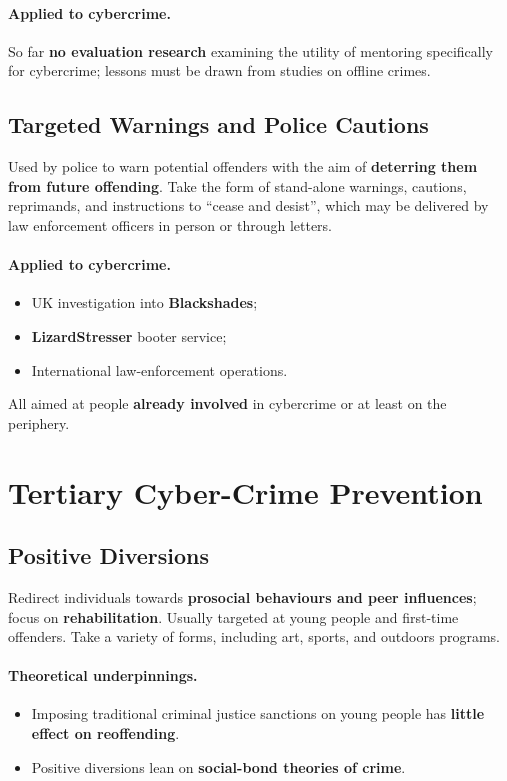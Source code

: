 \documentclass[11pt,a4paper,openany]{report}
\theoremstyle{definition}
\theoremstyle{plain}
\theoremstyle{remark}
\begin{document}
\paragraph{Applied to cybercrime.} So far \textbf{no evaluation research} examining the utility of mentoring specifically for cybercrime; lessons must be drawn from studies on offline crimes.

\subsection{Targeted Warnings and Police Cautions}

Used by police to warn potential offenders with the aim of \textbf{deterring them from future offending}. Take the form of stand-alone warnings, cautions, reprimands, and instructions to ``cease and desist'', which may be delivered by law enforcement officers in person or through letters.

\paragraph{Applied to cybercrime.}
\begin{itemize}
    \item UK investigation into \textbf{Blackshades};
    \item \textbf{LizardStresser} booter service;
    \item International law-enforcement operations.
\end{itemize}
All aimed at people \textbf{already involved} in cybercrime or at least on the periphery.

\section{Tertiary Cyber-Crime Prevention}

\subsection{Positive Diversions}

Redirect individuals towards \textbf{prosocial behaviours and peer influences}; focus on \textbf{rehabilitation}. Usually targeted at young people and first-time offenders. Take a variety of forms, including art, sports, and outdoors programs.

\paragraph{Theoretical underpinnings.}
\begin{itemize}
    \item Imposing traditional criminal justice sanctions on young people has \textbf{little effect on reoffending}.
    \item Positive diversions lean on \textbf{social-bond theories of crime}.
\end{itemize}
\end{document}
